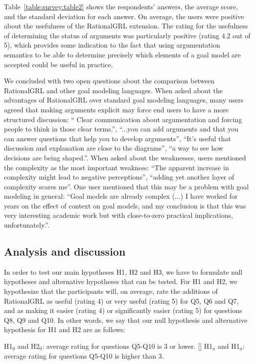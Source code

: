 {Table~\ref{table:survey:table2} shows the respondents' answers, the average score, and the standard deviation for each answer. On average, the users were positive about the usefulness of the RationalGRL extension. The rating for the usefulness of determining the status of arguments was particularly positive (rating 4.2 out of 5), which provides some indication to the fact that using argumentation semantics to be able to determine precisely which elements of a goal model are accepted could be useful in practice.

We concluded with two open questions about the comparison between RationalGRL and other goal modeling languages. When asked about the advantages of RationalGRL over standard goal modeling languages, many users agreed that making arguments explicit may force end users to have a more structured discussion: ``	Clear communication about argumentation and forcing people to think in those clear terms.'', ``...you can add arguments and that you can answer questions that help you to develop arguments'', ``It's useful that discussion and explanation are close to the diagrams'', ``a way to see how decisions are being shaped.''. When asked about the weaknesses, users mentioned the complexity as the most important weakness: ``The apparent increase in complexity might lead to negative perceptions'', ``adding yet another layer of complexity scares me''. One user mentioned that this may be a problem with goal modeling in general: ``Goal models are already complex (...) I have worked for years on the effect of context on goal models, and my conclusion is that this was very interesting academic work but with close-to-zero practical implications, unfortunately.''.

\subsection{Analysis and discussion}
In order to test our main hypotheses H1, H2 and H3, we have to formulate null hypotheses and alternative hypotheses that can be tested. For H1 and H2, we hypothesize that the participants will, on average, rate the additions of RationalGRL as useful (rating 4) or very useful (rating 5) for Q5, Q6 and Q7, and as making it easier (rating 4) or significantly easier (rating 5) for questions Q8, Q9 and Q10. In other words, we say that our null hypothesis and alternative hypothesis for H1 and H2 are as follows:
\begin{itemize}
[] H1$_{0}$ and H2$_{0}$: average rating for questions Q5-Q10 is 3 or lower.
[] H1$_{a}$ and H1$_{a}$: average rating for questions Q5-Q10 is higher than 3.
\end{itemize}

}

